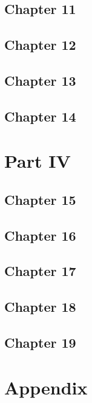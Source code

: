 \documentclass[a4paper]{article}
\begin{document}
    \subsection*{Chapter 11}
    \subsection*{Chapter 12}
    \subsection*{Chapter 13}
    \subsection*{Chapter 14}
\section*{Part IV}
    \subsection*{Chapter 15}
    \subsection*{Chapter 16}
    \subsection*{Chapter 17}
    \subsection*{Chapter 18}
    \subsection*{Chapter 19}
\section*{Appendix}
\end{document}
